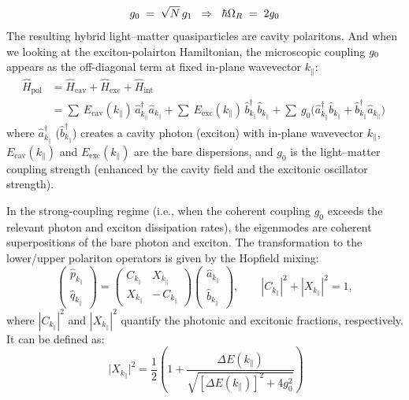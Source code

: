 \begin{equation}
g_{\rm 0} \;=\; \sqrt{N}\,g_1 \;\;\Rightarrow\;\;
\hbar\Omega_R \;=\; 2 g_{\rm 0}
\end{equation}\vspace{-0.5em}
The resulting hybrid light–matter quasiparticles are cavity polaritons. 
And when we looking at the exciton-polairton Hamiltonian, the microscopic coupling $g_{\rm 0}$ appears as the off-diagonal term at fixed in-plane wavevector $k_{\parallel}$\cite{Rahimi-Iman2020-tt,Deng2010-ul}:
\begin{equation}
\begin{aligned}
\hat H_{\mathrm{pol}}
&= \hat H_{\mathrm{cav}}+\hat H_{\mathrm{exc}}+\hat H_{\mathrm{int}} \\
&= \sum\!\
  E_{\mathrm{cav}}(k_\parallel)\,\hat a_{k_\parallel}^{\dagger}\hat a_{k_\parallel}
 +\sum\!\
  E_{\mathrm{exc}}(k_\parallel)\,\hat b_{k_\parallel}^{\dagger}\hat b_{k_\parallel}
 +\sum\!\
  g_0\big(\hat a_{k_\parallel}^{\dagger}\hat b_{k_\parallel}
         +\hat b_{k_\parallel}^{\dagger}\hat a_{k_\parallel}\big)
\end{aligned}\
\label{eq:H_polariton}
\end{equation}
where $\hat{a}^{\dagger}_{k_{\parallel}}$ ($\hat{b}^{\dagger}_{k_{\parallel}}$) creates a cavity photon (exciton) with in-plane wavevector $k_{\parallel}$, $E_{\mathrm{cav}}(k_{\parallel})$ and $E_{\mathrm{exc}}(k_{\parallel})$ are the bare dispersions, and $g_0$ is the light–matter coupling strength (enhanced by the cavity field and the excitonic oscillator strength).

In the strong-coupling regime (i.e., when the coherent coupling $g_0$ exceeds the relevant photon and exciton dissipation rates), the eigenmodes are coherent superpositions of the bare photon and exciton. 
The transformation to the lower/upper polariton operators is given by the Hopfield mixing\cite{Rahimi-Iman2020-tt,Deng2010-ul}:
\begin{equation}
\begin{pmatrix}
\hat{p}_{k_{\parallel}} \\
\hat{q}_{k_{\parallel}}
\end{pmatrix}
=
\begin{pmatrix}
C_{k_{\parallel}} & X_{k_{\parallel}} \\
X_{k_{\parallel}} & -\,C_{k_{\parallel}}
\end{pmatrix}
\begin{pmatrix}
\hat{a}_{k_{\parallel}} \\
\hat{b}_{k_{\parallel}}
\end{pmatrix},
\qquad
|C_{k_{\parallel}}|^{2}+|X_{k_{\parallel}}|^{2}=1,
\label{eq:Hopfield}
\end{equation}
where $|C_{k_{\parallel}}|^{2}$ and $|X_{k_{\parallel}}|^{2}$ quantify the photonic and excitonic fractions, respectively. It can be defined as\cite{Rahimi-Iman2020-tt,Deng2010-ul}:
\begin{equation}\
\lvert X_{k_\parallel}\rvert^{2}
= \frac{1}{2}\!\left(
1 + \frac{\Delta E(k_\parallel)}{\sqrt{[\Delta E(k_\parallel)]^{2}+4 g_0^{2}}}
\right)
\label{eq:Hopcoefficient_Xk}
\end{equation}

